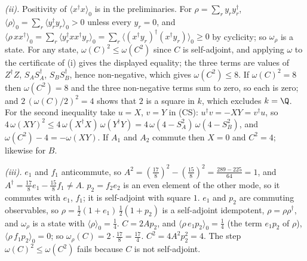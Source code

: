 \emph{(ii).} Positivity of $\langle x^{\dagger}x\rangle_{0}$ is in the preliminaries. For $\rho = \sum_{r}y_{r}y_{r}^{\dagger}$, $\langle\rho\rangle_{0} = \sum_{r}\langle y_{r}^{\dagger}y_{r}\rangle_{0} > 0$ unless every $y_{r} = 0$, and $\langle\rho\,xx^{\dagger}\rangle_{0} = \sum_{r}\langle y_{r}^{\dagger}xx^{\dagger}y_{r}\rangle_{0} = \sum_{r}\langle(x^{\dagger}y_{r})^{\dagger}(x^{\dagger}y_{r})\rangle_{0} \ge 0$ by cyclicity; so $\omega_{\rho}$ is a state. For any state, $\omega(C)^{2} \le \omega(C^{2})$ since $C$ is self-adjoint, and applying $\omega$ to the certificate of (i) gives the displayed equality; the three terms are values of $Z^{\dagger}Z$, $S_{A}S_{A}^{\dagger}$, $S_{B}S_{B}^{\dagger}$, hence non-negative, which gives $\omega(C^{2}) \le 8$. If $\omega(C)^{2} = 8$ then $\omega(C^{2}) = 8$ and the three non-negative terms sum to zero, so each is zero; and $2\,(\omega(C)/2)^{2} = 4$ shows that $2$ is a square in $k$, which excludes $k = \Q$. For the second inequality take $u = X$, $v = Y$ in (CS): $u^{\dagger}v = -XY = v^{\dagger}u$, so $4\,\omega(XY)^{2} \le 4\,\omega(X^{\dagger}X)\,\omega(Y^{\dagger}Y) = 4\,\omega(4 - S_{A}^{2})\,\omega(4 - S_{B}^{2})$, and $\omega(C^{2}) - 4 = -\omega(XY)$. If $A_{1}$ and $A_{2}$ commute then $X = 0$ and $C^{2} = 4$; likewise for $B$.

\emph{(iii).} $e_{1}$ and $f_{1}$ anticommute, so $A^{2} = (\tfrac{17}{8})^{2} - (\tfrac{15}{8})^{2} = \tfrac{289 - 225}{64} = 1$, and $A^{\dagger} = \tfrac{17}{8}e_{1} - \tfrac{15}{8}f_{1} \ne A$. $p_{2} = f_{2}e_{2}$ is an even element of the other mode, so it commutes with $e_{1}$, $f_{1}$; it is self-adjoint with square $1$. $e_{1}$ and $p_{2}$ are commuting observables, so $\rho = \tfrac12(1 + e_{1})\,\tfrac12(1 + p_{2})$ is a self-adjoint idempotent, $\rho = \rho\rho^{\dagger}$, and $\omega_{\rho}$ is a state with $\langle\rho\rangle_{0} = \tfrac14$. $C = 2Ap_{2}$, and $\langle\rho\,e_{1}p_{2}\rangle_{0} = \tfrac14$ (the term $e_{1}p_{2}$ of $\rho$), $\langle\rho\,f_{1}p_{2}\rangle_{0} = 0$; so $\omega_{\rho}(C) = 2 \cdot \tfrac{17}{8} = \tfrac{17}{4}$. $C^{2} = 4A^{2}p_{2}^{2} = 4$. The step $\omega(C)^{2} \le \omega(C^{2})$ fails because $C$ is not self-adjoint.

